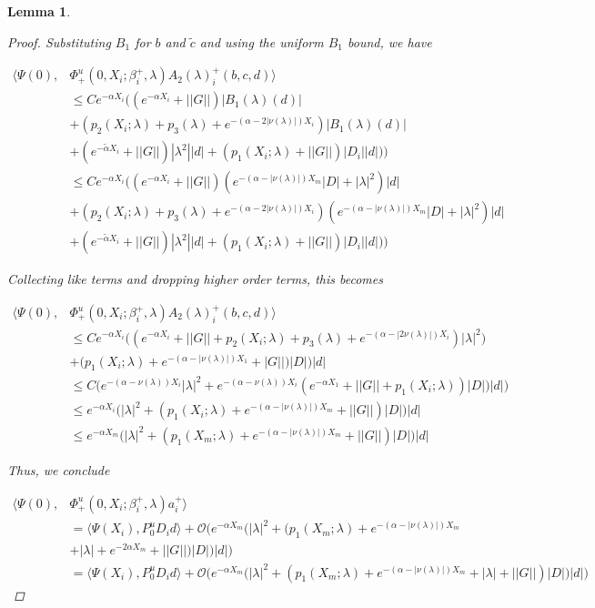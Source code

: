 \documentclass[12pt]{article}
\newtheorem{lemma}{Lemma}
\begin{document}
\begin{lemma}
\begin{proof}
Substituting $B_1$ for $b$ and $\tilde{c}$ and using the uniform $B_1$ bound, we have

\begin{align*}
\langle \Psi(0), &\Phi^u_+(0, X_i; \beta_i^+, \lambda) A_2(\lambda)_i^+(b,c,d) \rangle \\
&\leq C e^{-\alpha X_i}  \Big( (e^{-\alpha X_i} + ||G||)|B_1(\lambda)(d)| \\
&+ ( p_2(X_i; \lambda) + p_3(\lambda) + e^{-(\alpha - 2|\nu(\lambda)|)X_i} )|B_1(\lambda)(d)| \\
&+ (e^{-\tilde{\alpha} X_i} + ||G||) |\lambda^2| |d| +(p_1(X_i; \lambda) + ||G|| )|D_i||d|) \Big) \\
&\leq C e^{-\alpha X_i}  \Big( (e^{-\alpha X_i} + ||G||)( e^{-(\alpha - |\nu(\lambda)|) X_m} |D| + |\lambda|^2 )|d| \\
&+ ( p_2(X_i; \lambda) + p_3(\lambda) + e^{-(\alpha - 2|\nu(\lambda)|)X_i} )( e^{-(\alpha - |\nu(\lambda)|) X_m} |D| + |\lambda|^2 )|d| \\
&+ (e^{-\tilde{\alpha} X_i} + ||G||) |\lambda^2| |d| +(p_1(X_i; \lambda) + ||G|| )|D_i||d|) \Big) 
\end{align*}

Collecting like terms and dropping higher order terms, this becomes

\begin{align*}
\langle \Psi(0), &\Phi^u_+(0, X_i; \beta_i^+, \lambda) A_2(\lambda)_i^+(b,c,d) \rangle \\
&\leq C e^{-\alpha X_i} \Big( (e^{-\alpha X_i} + ||G|| + p_2(X_i; \lambda) + p_3(\lambda) + e^{-(\alpha - |2 \nu(\lambda)|)X_i} ) |\lambda|^2 ) \\
&+ (p_1(X_i; \lambda) + e^{-(\alpha - |\nu(\lambda)|) X_1} + |G|| )|D| \Big)|d| \\
&\leq C \Big( e^{-(\alpha - \nu(\lambda)) X_i} |\lambda|^2 
+ e^{-(\alpha - \nu(\lambda)) X_i}( e^{-\alpha X_1} + ||G|| + p_1(X_i; \lambda))|D| )|d| \Big) \\
&\leq e^{-\alpha X_i} \Big( |\lambda|^2  + (p_1(X_i; \lambda) + e^{-(\alpha - |\nu(\lambda)|) X_m} + ||G|| )|D| \Big)|d| \\
&\leq e^{-\alpha X_m} \Big( |\lambda|^2  + (p_1(X_m; \lambda) + e^{-(\alpha - |\nu(\lambda)|) X_m} + ||G|| )|D| \Big)|d| 
\end{align*}

Thus, we conclude

\begin{align*}
\langle \Psi(0), &\Phi^u_+(0, X_i; \beta_i^+, \lambda) a_i^+ \rangle \\
&= \langle \Psi(X_i), P^u_0 D_i d \rangle + \mathcal{O}\Big(e^{-\alpha X_m} \Big( |\lambda|^2  + (p_1(X_m; \lambda) + e^{-(\alpha - |\nu(\lambda)|) X_m} \\
&+ |\lambda| + e^{-2 \alpha X_m} + ||G|| )|D| \Big)|d|  \Big) \\
&= \langle \Psi(X_i), P^u_0 D_i d \rangle + \mathcal{O}\Big(e^{-\alpha X_m} \Big( |\lambda|^2  + (p_1(X_m; \lambda) + e^{-(\alpha - |\nu(\lambda)|) X_m} + |\lambda| + ||G|| )|D| \Big)|d| \Big)
\end{align*}


\end{proof}
\end{lemma}
\end{document}
